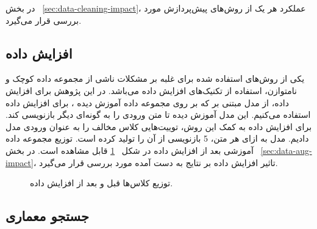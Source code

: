 در بخش
~\ref{sec:data-cleaning-impact}،
 عملکرد هر یک از روش‌های پیش‌پردازش مورد بررسی قرار می‌گیرد.

\subsection{افزایش داده}\label{sec:dataaug}
یکی از روش‌های استفاده شده برای غلبه بر مشکلات ناشی از مجموعه داده کوچک و نامتوازن، استفاده از تکنیک‌های افزایش داده می‌باشد. در این پژوهش برای افزایش داده، از مدل مبتنی بر
که بر روی مجموعه داده‌
\cite{chatgpt-paraphrases-dataset}
آموزش دیده
\cite{chatgpt-paraphraser}
، برای افزایش داده استفاده می‌کنیم. این مدل آموزش دیده تا متن ورودی را به گونه‌ای دیگر بازنویسی
 کند. برای افزایش داده به کمک این روش، توییت‌هایی کلاس مخالف را به عنوان ورودی مدل دادیم. مدل به ازای هر متن، 5 بازنویسی از آن را تولید کرده است. توزیع مجموعه داده آموزشی بعد از افزایش داده در شکل~
 \ref{dataset-distribution}
 قابل مشاهده است. در بخش
 ~\ref{sec:data-aug-impact}،
تاثیر افزایش داده بر نتایج به دست آمده مورد بررسی قرار می‌گیرد.

\begin{figure}[H]
	\caption{توزیع کلاس‌ها قبل و بعد از افزایش داده.}
	\label{dataset-distribution}
\end{figure}
\subsection{جستجو معماری}

